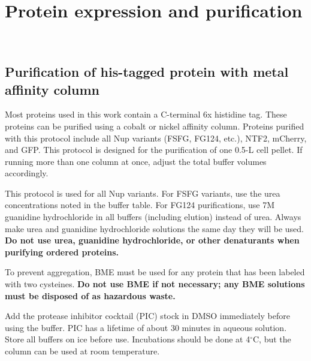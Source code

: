 \chapter{Protein expression and purification}~\label{appx:protein-purification}

\section{Purification of his-tagged protein with metal affinity column}

Most proteins used in this work contain a C-terminal 6x histidine tag.  These proteins can be purified using a cobalt or nickel affinity column.  Proteins purified with this protocol include all Nup variants (FSFG, FG124, etc.), NTF2, mCherry, and GFP.  This protocol is designed for the purification of one 0.5-L cell pellet.  If running more than one column at once, adjust the total buffer volumes accordingly.

This protocol is used for all Nup variants.  For FSFG variants, use the urea concentrations noted in the buffer table.  For FG124 purifications, use 7M guanidine hydrochloride in all buffers (including elution) instead of urea.  Always make urea and guanidine hydrochloride solutions the same day they will be used. \textbf{Do not use urea, guanidine hydrochloride, or other denaturants when purifying ordered proteins.}

To prevent aggregation, BME must be used for any protein that has been labeled with two cysteines. \textbf{Do not use BME if not necessary; any BME solutions must be disposed of as hazardous waste.}

Add the protease inhibitor cocktail (PIC) stock in DMSO immediately before using the buffer.  PIC has a lifetime of about 30 minutes in aqueous solution.  Store all buffers on ice before use.  Incubations should be done at 4$^\circ$C, but the column can be used at room temperature.

